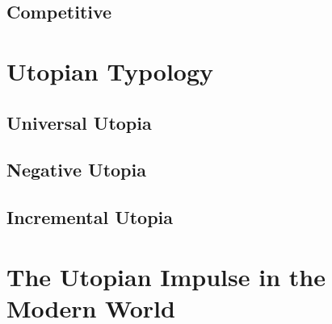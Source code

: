 \documentclass[12pt]{article}
\begin{document}
\subsection{Competitive}

\section{Utopian Typology}
\subsection{Universal Utopia}
\subsection{Negative Utopia}
\subsection{Incremental Utopia}

\section{The Utopian Impulse in the Modern World}
\end{document}
